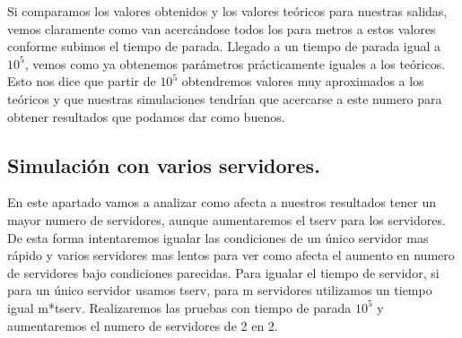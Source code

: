 \documentclass[]{article}
\begin{document}
Si comparamos los valores obtenidos y los valores teóricos para nuestras salidas, vemos claramente como van acercándose todos los para metros a estos valores conforme subimos el tiempo de parada. Llegado a un tiempo de parada igual a $10^5$, vemos como ya obtenemos parámetros prácticamente iguales a los teóricos. Esto nos dice que partir de $10^5$ obtendremos valores muy aproximados a los teóricos y que nuestras simulaciones tendrían que acercarse a este numero para obtener resultados que podamos dar como buenos.

\subsection{Simulación con varios servidores.}
En este apartado vamos a analizar como afecta a nuestros resultados tener un mayor numero de servidores, aunque aumentaremos el tserv para los servidores. De esta forma intentaremos igualar las condiciones de un único servidor mas rápido y varios servidores mas lentos para ver como afecta el aumento en numero de servidores bajo condiciones parecidas. Para igualar el tiempo de servidor, si para un único servidor usamos tserv, para m servidores utilizamos un tiempo igual m*tserv.
Realizaremos las pruebas con tiempo de parada $10^5$ y aumentaremos el numero de servidores de 2 en 2.
\end{document}
